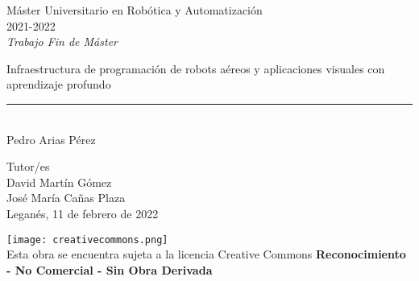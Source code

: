 \begin{titlepage}
	\begin{sffamily}
	\color{azulUC3M}
	\begin{center}
		\begin{figure}[H] %
		\end{figure}
		\vspace{2.5cm}
		\begin{Large}
			Máster Universitario en Robótica y Automatización\\			
			 2021-2022\\ %
			\vspace{2cm}		
			\textsl{Trabajo Fin de Máster}
			\bigskip
			
		\end{Large}
		 	{\Huge  Infraestructura de programación de robots aéreos y aplicaciones visuales con aprendizaje profundo}\\
		 	\vspace*{0.5cm}
	 		\rule{10.5cm}{0.1mm}\\
			\vspace*{0.9cm}
			{\LARGE Pedro Arias Pérez}\\ 
			\vspace*{1cm}
		\begin{Large}
			Tutor/es\\
			David Martín Gómez \\
			José María Cañas Plaza \\
			Leganés, 11 de febrero de 2022\\
		\end{Large}
	\end{center}
	\vfill
	\color{black}
	
	\noindent\texttt{[image: creativecommons.png]}\\ %
	\footnotesize{Esta obra se encuentra sujeta a la licencia Creative Commons \textbf{Reconocimiento - No Comercial - Sin Obra Derivada}}
	
	\end{sffamily}
\end{titlepage}
